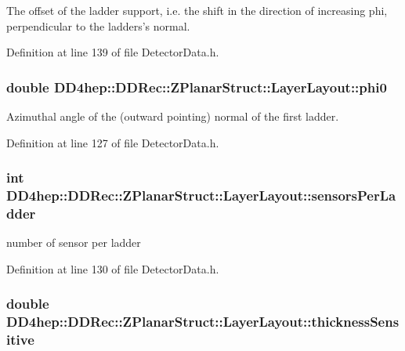 The offset of the ladder support, i.e. the shift in the direction of increasing phi, perpendicular to the ladders's normal. 

Definition at line 139 of file DetectorData.h.\hypertarget{struct_d_d4hep_1_1_d_d_rec_1_1_z_planar_struct_1_1_layer_layout_ab8c82da52f15d64226f8ef416194f97a}{
\subsubsection[{phi0}]{\setlength{\rightskip}{0pt plus 5cm}double {\bf DD4hep::DDRec::ZPlanarStruct::LayerLayout::phi0}}}
\label{struct_d_d4hep_1_1_d_d_rec_1_1_z_planar_struct_1_1_layer_layout_ab8c82da52f15d64226f8ef416194f97a}


Azimuthal angle of the (outward pointing) normal of the first ladder. 

Definition at line 127 of file DetectorData.h.\hypertarget{struct_d_d4hep_1_1_d_d_rec_1_1_z_planar_struct_1_1_layer_layout_a8dae7b7f1795d92d7edca6571933ee00}{
\subsubsection[{sensorsPerLadder}]{\setlength{\rightskip}{0pt plus 5cm}int {\bf DD4hep::DDRec::ZPlanarStruct::LayerLayout::sensorsPerLadder}}}
\label{struct_d_d4hep_1_1_d_d_rec_1_1_z_planar_struct_1_1_layer_layout_a8dae7b7f1795d92d7edca6571933ee00}


number of sensor per ladder 

Definition at line 130 of file DetectorData.h.\hypertarget{struct_d_d4hep_1_1_d_d_rec_1_1_z_planar_struct_1_1_layer_layout_a892de05e4a65f7fcd96493f7e24f060d}{
\subsubsection[{thicknessSensitive}]{\setlength{\rightskip}{0pt plus 5cm}double {\bf DD4hep::DDRec::ZPlanarStruct::LayerLayout::thicknessSensitive}}}
\label{struct_d_d4hep_1_1_d_d_rec_1_1_z_planar_struct_1_1_layer_layout_a892de05e4a65f7fcd96493f7e24f060d}


